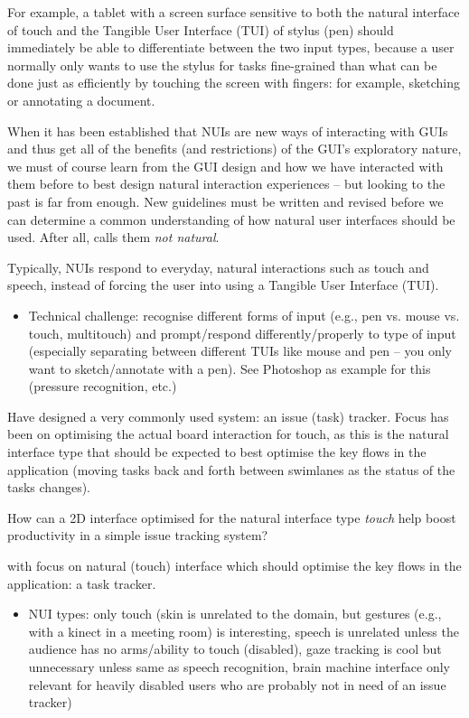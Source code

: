 For example, a tablet with a screen surface sensitive to both the natural interface of touch and the Tangible User Interface (TUI) of stylus (pen) should immediately be able to differentiate between the two input types, because a user normally only wants to use the stylus for tasks fine-grained than what can be done just as efficiently by touching the screen with fingers: for example, sketching or annotating a document.

When it has been established that NUIs are new ways of interacting with GUIs and thus get all of the benefits (and restrictions) of the GUI's exploratory nature, we must of course learn from the GUI design and how we have interacted with them before to best design natural interaction experiences -- but looking to the past is far from enough. New guidelines must be written and revised before we can determine a common understanding of how natural user interfaces should be used. After all, \textcite{norman:natural-user-interfaces-are-not-natural:2010} calls them \textit{not natural}.

Typically, NUIs respond to everyday, natural interactions such as touch and speech, instead of forcing the user into using a Tangible User Interface (TUI).

\begin{itemize}
  \item Technical challenge: recognise different forms of input (e.g., pen vs. mouse vs. touch, multitouch) and prompt/respond differently/properly to type of input (especially separating between different TUIs like mouse and pen -- you only want to sketch/annotate with a pen). See Photoshop as example for this (pressure recognition, etc.)
\end{itemize}

Have designed a very commonly used system: an issue (task) tracker. Focus has been on optimising the actual board interaction for touch, as this is the natural interface type that should be expected to best optimise the key flows in the application (moving tasks back and forth between swimlanes as the status of the tasks changes).


How can a 2D interface optimised for the natural interface type \textit{touch} help boost productivity in a simple issue tracking system?


with focus on natural (touch) interface which should optimise the key flows in the application: a task tracker.

\begin{itemize}
  \item NUI types: only touch (skin is unrelated to the domain, but gestures (e.g., with a kinect in a meeting room) is interesting, speech is unrelated unless the audience has no arms/ability to touch (disabled), gaze tracking is cool but unnecessary unless same as speech recognition, brain machine interface only relevant for heavily disabled users who are probably not in need of an issue tracker)
\end{itemize}
